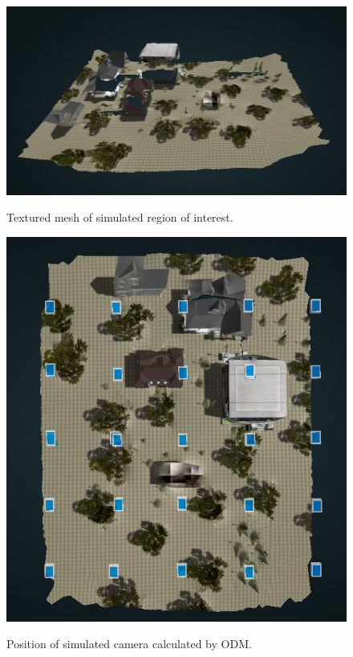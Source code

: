 \begin{figure}
	\centering
	\caption[Textured mesh of simulated region of interest.]{\small Textured mesh of simulated region of interest.} 
	\includegraphics[width=5in]{figures/experiment/textured-simulated}
	\label{fig:textured-map-simulated}
\end{figure}

\begin{figure}
	\centering
	\caption[Position of simulated camera calculated by ODM.]{\small Position of simulated camera calculated by ODM.} 
	\includegraphics[width=5in]{figures/experiment/simulated-camera}
	\label{fig:simulated-camera-position}
\end{figure}

